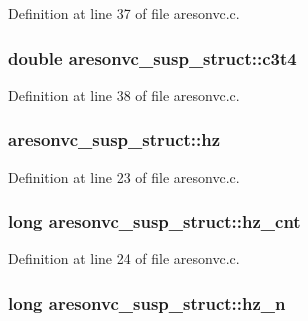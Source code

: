 Definition at line 37 of file aresonvc.\+c.

\subsubsection[{\texorpdfstring{c3t4}{c3t4}}]{\setlength{\rightskip}{0pt plus 5cm}double aresonvc\+\_\+susp\+\_\+struct\+::c3t4}\hypertarget{structaresonvc__susp__struct_a12c4e6622fe370f72361eeec90def8e0}{}\label{structaresonvc__susp__struct_a12c4e6622fe370f72361eeec90def8e0}


Definition at line 38 of file aresonvc.\+c.

\subsubsection[{\texorpdfstring{hz}{hz}}]{ aresonvc\+\_\+susp\+\_\+struct\+::hz}\hypertarget{structaresonvc__susp__struct_ae9fc1e8652690d35706436ff8b778111}{}\label{structaresonvc__susp__struct_ae9fc1e8652690d35706436ff8b778111}


Definition at line 23 of file aresonvc.\+c.

\subsubsection[{\texorpdfstring{hz\+\_\+cnt}{hz_cnt}}]{\setlength{\rightskip}{0pt plus 5cm}long aresonvc\+\_\+susp\+\_\+struct\+::hz\+\_\+cnt}\hypertarget{structaresonvc__susp__struct_a9a3dfd6c2b22892c97b9a11fd98bad13}{}\label{structaresonvc__susp__struct_a9a3dfd6c2b22892c97b9a11fd98bad13}


Definition at line 24 of file aresonvc.\+c.

\subsubsection[{\texorpdfstring{hz\+\_\+n}{hz_n}}]{\setlength{\rightskip}{0pt plus 5cm}long aresonvc\+\_\+susp\+\_\+struct\+::hz\+\_\+n}\hypertarget{structaresonvc__susp__struct_ad8019575d7c37f9d5f7926637519ce1b}{}\label{structaresonvc__susp__struct_ad8019575d7c37f9d5f7926637519ce1b}


